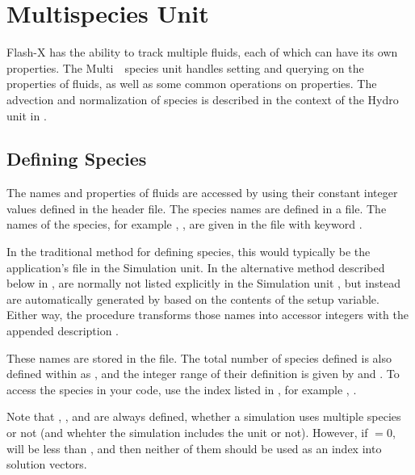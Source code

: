 \chapter{Multispecies Unit}
\label{Chp:Multispecies Unit}


Flash-X has the ability to track multiple fluids, each of which can have
its own properties.  The \unit{Multi\-species} unit handles setting and querying
on the properties of fluids, as well as some common operations on properties.
The advection and normalization of species is
described in the context of the Hydro unit in .

\section{Defining Species}
\label{Sec:defining_species}

The names and properties of fluids are accessed by using their constant integer values defined
in the  header file.
The species names are defined in a  file.
The names of the species, for example , , are given in the  file with keyword .

In the traditional method for defining species, this  would typically be
the application's  file in the \unit{Simulation} unit.
In the alternative method described below in ,
 are normally not listed explicitly in
the \unit{Simulation} unit ,
but instead are automatically generated by 
based on the contents of the  setup variable.
Either way, the  procedure transforms those names into
accessor integers with the appended description .

These names are stored in the  file.  The total number of species defined is also defined within  as , and the integer range of their definition is given by  and .
To access the species in your code, use the index listed in , for example , .

Note that , , and 
are always defined, whether a simulation uses multiple species or
not (and whehter the simulation includes the  unit
or not). However, if $=0$, 
 will be less than , and
then neither of them should be used as an index into solution vectors.

